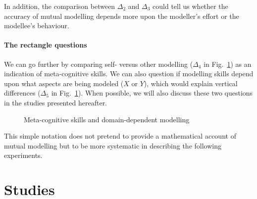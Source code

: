 \documentclass[natbib]{svjour3}
\newcommand{\Model}[3]{{$\mathcal{M}^{\circ}(#1, #2, #3)$}}
\begin{document}
In addition, the comparison between $\Delta_2$ and $\Delta_3$ could tell us
whether the accuracy of mutual modelling depends more upon the modeller's effort
or the modellee's behaviour.

\paragraph{The rectangle questions}

We can go further by comparing self- versus other modelling ($\Delta_4$ in
Fig.~\ref{mm_rectangle}) as an indication of meta-cognitive skills. We can also
question if modelling skills depend upon what aspects are being modeled ($X$ or
$Y$), which would explain vertical differences ($\Delta_5$ in
Fig.~\ref{mm_rectangle}). When possible, we will also discuss these two
questions in the studies presented hereafter.

\begin{figure}[htb]
\centering


\caption{\small Meta-cognitive skills and domain-dependent modelling}

\label{mm_rectangle}
\end{figure}


This simple notation does not pretend to provide a mathematical account of
mutual modelling but to be more systematic in describing the following
experiments. 



\section{Studies}
\end{document}
